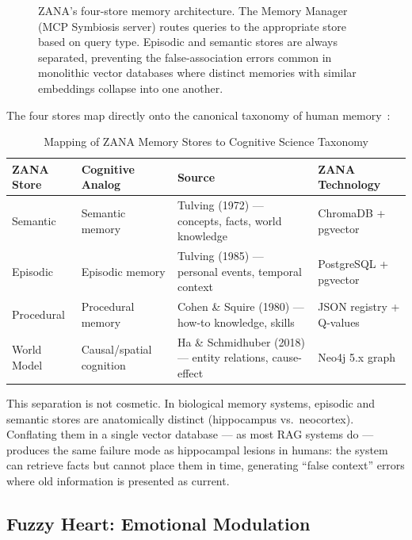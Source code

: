 \documentclass[12pt,a4paper]{article}
\begin{document}
\begin{figure}[H]
{%
}
\caption{ZANA's four-store memory architecture. The Memory Manager (MCP Symbiosis server)
routes queries to the appropriate store based on query type. Episodic and semantic stores
are always separated, preventing the false-association errors common in monolithic vector
databases where distinct memories with similar embeddings collapse into one another.}
\label{fig:memory}
\end{figure}

\vspace{0.6em}
\noindent The four stores map directly onto the canonical taxonomy of human
memory~\cite{tulving1985elements,cohen1980preserved}:

\begin{table}[H]
\centering
\caption{Mapping of ZANA Memory Stores to Cognitive Science Taxonomy}
\begin{tabular}{@{}p{2.8cm}p{3.2cm}p{3.2cm}p{3.5cm}@{}}
\toprule
\textbf{ZANA Store} & \textbf{Cognitive Analog} & \textbf{Source} & \textbf{ZANA Technology}\\
\midrule
Semantic  & Semantic memory & Tulving (1972) — concepts, facts, world knowledge
          & ChromaDB + pgvector\\[3pt]
Episodic  & Episodic memory & Tulving (1985) — personal events, temporal context
          & PostgreSQL + pgvector\\[3pt]
Procedural & Procedural memory & Cohen \& Squire (1980) — how-to knowledge, skills
           & JSON registry + Q-values\\[3pt]
World Model & Causal/spatial cognition & Ha \& Schmidhuber (2018) — entity relations, cause-effect
            & Neo4j 5.x graph\\
\bottomrule
\end{tabular}
\end{table}
\vspace{0.4em}

\noindent This separation is not cosmetic. In biological memory systems, episodic and semantic
stores are anatomically distinct (hippocampus vs.\ neocortex). Conflating them in a single
vector database --- as most RAG systems do --- produces the same failure mode as hippocampal
lesions in humans: the system can retrieve facts but cannot place them in time, generating
``false context'' errors where old information is presented as current.

\subsection{Fuzzy Heart: Emotional Modulation}
\end{document}
